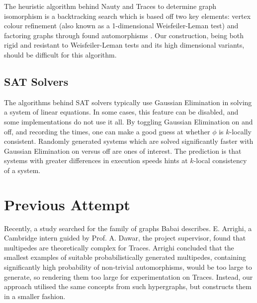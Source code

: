 The heuristic algorithm behind Nauty and Traces to determine graph isomorphism is a backtracking search which is based off two key elements: vertex colour refinement (also known as a 1-dimensional Weisfeiler-Leman test) and factoring graphs through found automorphisms \cite{mckay2014practical}. Our construction, being both rigid and resistant to Weisfeiler-Leman tests and its high dimensional variants, should be difficult for this algorithm.

\newpage
\subsection{SAT Solvers}
The algorithms behind SAT solvers typically use Gaussian Elimination in solving a system of linear equations. In some cases, this feature can be disabled, and some implementations do not use it all. By toggling Gaussian Elimination on and off, and recording the times, one can make a good guess at whether $\phi$ is $k$-locally consistent. Randomly generated systems which are solved significantly faster with Gaussian Elimination on versus off are ones of interest. The prediction is that systems with greater differences in execution speeds hints at $k$-local consistency of a system.

\section{Previous Attempt}
Recently, a study searched for the family of graphs Babai describes. E. Arrighi, a Cambridge intern guided by Prof. A. Dawar, the project supervisor, found that multipedes are theoretically complex for Traces. Arrighi concluded that the smallest examples of suitable probabilistically generated multipedes, containing significantly high probability of non-trivial automorphisms, would be too large to generate, so rendering them too large for experimentation on Traces. Instead, our approach utilised the same concepts from such hypergraphs, but constructs them in a smaller fashion.








